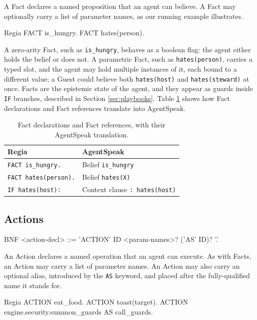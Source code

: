 A Fact declares a named proposition that an agent can believe. A Fact may optionally carry a list of parameter names, as our running example illustrates.

\begin{codeblock}[]{Regia}
    FACT is_hungry.
    FACT hates(person).
\end{codeblock}

A zero-arity Fact, such as \lstinline|is_hungry|, behaves as a boolean flag: the agent either holds the belief or does not. A parametric Fact, such as \lstinline|hates(person)|, carries a typed slot, and the agent may hold multiple instances of it, each bound to a different value; a Guest could believe both \lstinline|hates(host)| and \lstinline|hates(steward)| at once. Facts are the epistemic state of the agent, and they appear as guards inside \lstinline|IF| branches, described in Section \ref{sec:playbooks}. Table \ref{tab:fact-mapping} shows how Fact declarations and Fact references translate into AgentSpeak.

\begin{table}[h]
\centering
\begin{tabular}{|l|l|}
\hline
\textbf{Regia} & \textbf{AgentSpeak} \\
\hline
\lstinline|FACT is_hungry.| & Belief \lstinline|is_hungry| \\
\lstinline|FACT hates(person).| & Belief \lstinline|hates(X)| \\
\lstinline|IF hates(host):| & Context clause \lstinline|: hates(host)| \\
\hline
\end{tabular}
\caption{Fact declarations and Fact references, with their AgentSpeak translation.}
\label{tab:fact-mapping}
\end{table}

\subsection{Actions}
\begin{codeblock}[]{BNF}
    <action-decl>    ::= 'ACTION' ID <param-names>? ('AS' ID)? '.'
\end{codeblock}

An Action declares a named operation that an agent can execute. As with Facts, an Action may carry a list of parameter names. An Action may also carry an optional alias, introduced by the \lstinline|AS| keyword, and placed after the fully-qualified name it stands for.

\begin{codeblock}[]{Regia}
    ACTION eat_food.
    ACTION toast(target).
    ACTION engine.security.summon_guards AS call_guards.
\end{codeblock}

